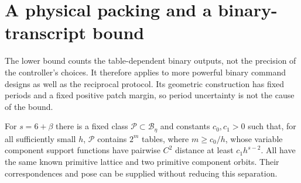 \section{A physical packing and a binary-transcript bound}
\label{sec:lower}
The lower bound counts the table-dependent binary outputs, not the
precision of the controller's choices. It therefore applies to more
powerful binary command designs as well as the reciprocal protocol.
Its geometric construction has fixed periods and a fixed positive
patch margin, so period uncertainty is not the cause of the bound.

\begin{lemma}\label{lem:packing}
For $s=6+\beta$ there is a fixed class $\mathcal P\subset\mathcal B_\eta$
and constants $c_0,c_1>0$ such that, for all sufficiently small $h$,
$\mathcal P$ contains $2^m$ tables, where $m\ge c_0/h$, whose variable
component support functions have pairwise $C^2$ distance at least
$c_1h^{s-2}$. All have the same known primitive lattice and two
primitive component orbits. Their correspondences and pose can be
supplied without reducing this separation.
\end{lemma}
